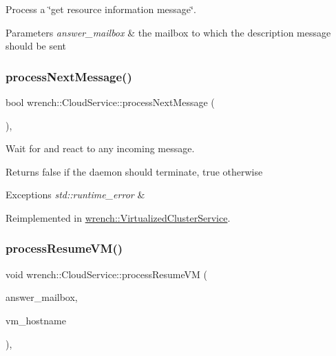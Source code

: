 Process a \char`\"{}get resource information message\char`\"{}. 


\begin{DoxyParams}{Parameters}
{\em answer\+\_\+mailbox} & the mailbox to which the description message should be sent \\
\hline
\end{DoxyParams}
\mbox{\label{classwrench_1_1_cloud_service_a52eb0332c09751c66b1e778a572ad3e9}} 
\subsubsection{\texorpdfstring{process\+Next\+Message()}{processNextMessage()}}
{\footnotesize\ttfamily bool wrench\+::\+Cloud\+Service\+::process\+Next\+Message (\begin{DoxyParamCaption}{ }\end{DoxyParamCaption})\hspace{0.3cm}{\ttfamily [protected]}, {\ttfamily [virtual]}}



Wait for and react to any incoming message. 

\begin{DoxyReturn}{Returns}
false if the daemon should terminate, true otherwise
\end{DoxyReturn}

\begin{DoxyExceptions}{Exceptions}
{\em std\+::runtime\+\_\+error} & \\
\hline
\end{DoxyExceptions}


Reimplemented in \hyperlink{classwrench_1_1_virtualized_cluster_service_aa9586ab2cda7b17c2ccccb5c465669af}{wrench\+::\+Virtualized\+Cluster\+Service}.

\mbox{\label{classwrench_1_1_cloud_service_a3bed2038f4bd826a6b9e91275fc32ffe}} 
\subsubsection{\texorpdfstring{process\+Resume\+V\+M()}{processResumeVM()}}
{\footnotesize\ttfamily void wrench\+::\+Cloud\+Service\+::process\+Resume\+VM (\begin{DoxyParamCaption}\item[{const std\+::string \&}]{answer\+\_\+mailbox,  }\item[{const std\+::string \&}]{vm\+\_\+hostname }\end{DoxyParamCaption})\hspace{0.3cm}{\ttfamily [protected]}, {\ttfamily [virtual]}}



